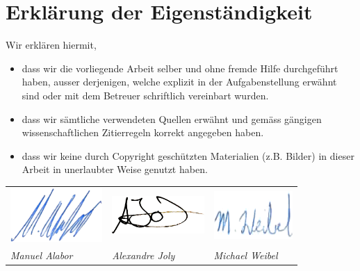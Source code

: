 \chapter*{Erklärung der Eigenständigkeit}

Wir erklären hiermit,

\begin{itemize}
	\item dass wir die vorliegende Arbeit selber und ohne fremde Hilfe durchgeführt haben, ausser derjenigen, welche explizit in der Aufgabenstellung erwähnt sind oder mit dem Betreuer schriftlich vereinbart wurden.
	\item dass wir sämtliche verwendeten Quellen erwähnt und gemäss gängigen wissenschaftlichen Zitierregeln korrekt angegeben haben.
	\item dass wir keine durch Copyright geschützten Materialien (z.B. Bilder) in dieser Arbeit in unerlaubter Weise genutzt haben.
\end{itemize}


\vspace*{3cm}

\begin{table}[H]
\begin{tabularx}{\textwidth}{X X X}
	\includegraphics[width=3.5cm]{content/images/signature-mal.png} &
	\centering\includegraphics[width=3.5cm]{content/images/signature-ajo.png} &
	\hfill\includegraphics[width=3cm]{content/images/signature-mwe.png}

	\tabularnewline

	\sffamily\textit{Manuel Alabor} &
	\centering\sffamily\textit{Alexandre Joly} &
	\hfill\sffamily\textit{Michael Weibel}
	\tabularnewline
\end{tabularx}
\end{table}